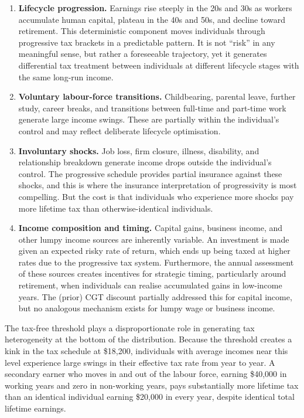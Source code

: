 \documentclass[12pt,a4paper]{article}
\begin{document}
\begin{enumerate}[label=(\alph*)]
\item \textbf{Lifecycle progression.} Earnings rise steeply in the 20s and 30s as workers accumulate human capital, plateau in the 40s and 50s, and decline toward retirement. This deterministic component moves individuals through progressive tax brackets in a predictable pattern. It is not ``risk'' in any meaningful sense, but rather a foreseeable trajectory, yet it generates differential tax treatment between individuals at different lifecycle stages with the same long-run income.

\item \textbf{Voluntary labour-force transitions.} Childbearing, parental leave, further study, career breaks, and transitions between full-time and part-time work generate large income swings. These are partially within the individual's control and may reflect deliberate lifecycle optimisation.

\item \textbf{Involuntary shocks.} Job loss, firm closure, illness, disability, and relationship breakdown generate income drops outside the individual's control. The progressive schedule provides partial insurance against these shocks, and this is where the insurance interpretation of progressivity is most compelling. But the cost is that individuals who experience more shocks pay more lifetime tax than otherwise-identical individuals.

\item \textbf{Income composition and timing.} Capital gains, business income, and other lumpy income sources are inherently variable. An investment is made given an expected risky rate of return, which ends up being taxed at higher rates due to the progressive tax system. Furthermore, the annual assessment of these sources creates incentives for strategic timing, particularly around retirement, when individuals can realise accumulated gains in low-income years. The (prior) CGT discount partially addressed this for capital income, but no analogous mechanism exists for lumpy wage or business income.
\end{enumerate}

The tax-free threshold plays a disproportionate role in generating tax heterogeneity at the bottom of the distribution. Because the threshold creates a kink in the tax schedule at \$18,200, individuals with average incomes near this level experience large swings in their effective tax rate from year to year. A secondary earner who moves in and out of the labour force, earning \$40,000 in working years and zero in non-working years, pays substantially more lifetime tax than an identical individual earning \$20,000 in every year, despite identical total lifetime earnings.
\end{document}
